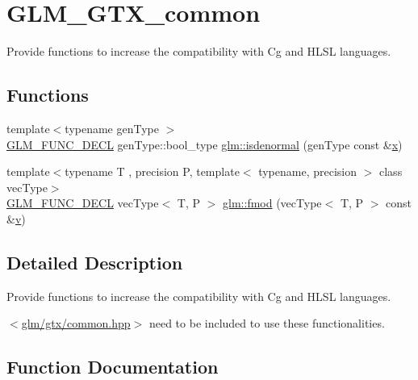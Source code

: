 \hypertarget{group__gtx__common}{}\section{G\+L\+M\+\_\+\+G\+T\+X\+\_\+common}
\label{group__gtx__common}


Provide functions to increase the compatibility with Cg and H\+L\+SL languages.  


\subsection*{Functions}
\begin{DoxyCompactItemize}
\item 
{\footnotesize template$<$typename gen\+Type $>$ }\\\mbox{\hyperlink{setup_8hpp_ab2d052de21a70539923e9bcbf6e83a51}{G\+L\+M\+\_\+\+F\+U\+N\+C\+\_\+\+D\+E\+CL}} gen\+Type\+::bool\+\_\+type \mbox{\hyperlink{group__gtx__common_ga74aa7c7462245d83bd5a9edf9c6c2d91}{glm\+::isdenormal}} (gen\+Type const \&\mbox{\hyperlink{glad_8h_a92d0386e5c19fb81ea88c9f99644ab1d}{x}})
\item 
{\footnotesize template$<$typename T , precision P, template$<$ typename, precision $>$ class vec\+Type$>$ }\\\mbox{\hyperlink{setup_8hpp_ab2d052de21a70539923e9bcbf6e83a51}{G\+L\+M\+\_\+\+F\+U\+N\+C\+\_\+\+D\+E\+CL}} vec\+Type$<$ T, P $>$ \mbox{\hyperlink{group__gtx__common_ga2580f50d4064557d62f4a533dfc6c7e3}{glm\+::fmod}} (vec\+Type$<$ T, P $>$ const \&\mbox{\hyperlink{glad_8h_a14cfbe2fc2234f5504618905b69d1e06}{v}})
\end{DoxyCompactItemize}


\subsection{Detailed Description}
Provide functions to increase the compatibility with Cg and H\+L\+SL languages. 

$<$\mbox{\hyperlink{gtx_2common_8hpp}{glm/gtx/common.\+hpp}}$>$ need to be included to use these functionalities. 

\subsection{Function Documentation}
\mbox{\label{group__gtx__common_ga2580f50d4064557d62f4a533dfc6c7e3}} 
